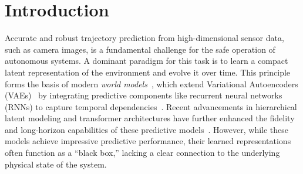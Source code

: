\documentclass[sigconf]{acmart}
\begin{document}





\maketitle
\section{Introduction}


Accurate and robust trajectory prediction from high-dimensional sensor data, such as camera images, is a fundamental challenge for the safe operation of autonomous systems. A dominant paradigm for this task is to learn a compact latent representation of the environment and evolve it over time. This principle forms the basis of modern \textit{world models}~\cite[]{ha2018world}, which extend Variational Autoencoders (VAEs)~\cite[]{kingma2013auto} by integrating predictive components like recurrent neural networks (RNNs) to capture temporal dependencies~\cite[]{mao2024safe,mao2025safe}. Recent advancements in hierarchical latent modeling and transformer architectures have further enhanced the fidelity and long-horizon capabilities of these predictive models~\cite[]{micheli2022transformers,hafner2023mastering,seo2023masked}. However, while these models achieve impressive predictive performance, their learned representations often function as a ``black box,'' lacking a clear connection to the underlying physical state of the system.
\end{document}
